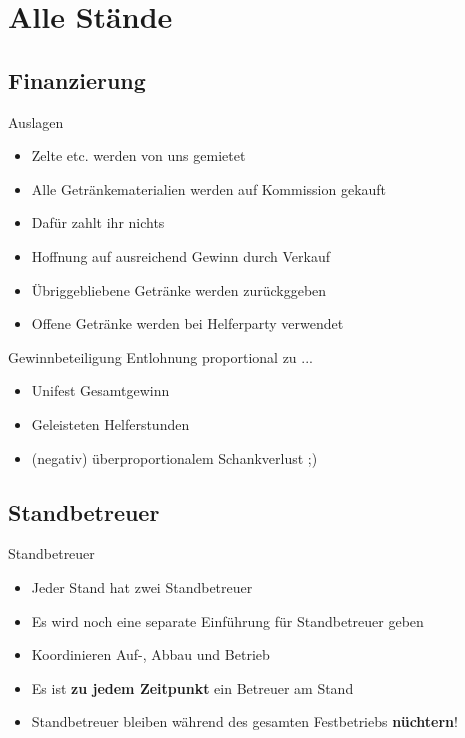 \section{Alle Stände}

\subsection{Finanzierung}

\begin{frame}[c]{Auslagen}
    \begin{itemize}[<+(1)->]
        \item Zelte etc. werden von uns gemietet
        \item Alle Getränkematerialien werden auf Kommission gekauft
        \item Dafür zahlt ihr nichts
        \item Hoffnung auf ausreichend Gewinn durch Verkauf
        \item Übriggebliebene Getränke werden zurückggeben
        \item Offene Getränke werden bei Helferparty verwendet
    \end{itemize}
\end{frame}

\begin{frame}[c]{Gewinnbeteiligung}
    Entlohnung proportional zu ...
    \begin{itemize}[<+(1)->]
        \item Unifest Gesamtgewinn
        \item Geleisteten Helferstunden
        \item (negativ) überproportionalem Schankverlust ;)
    \end{itemize}
\end{frame}


\subsection{Standbetreuer}

\begin{frame}[c]{Standbetreuer}
    \begin{itemize}[<+(1)->]
        \item Jeder Stand hat zwei Standbetreuer
        \item Es wird noch eine separate Einführung für Standbetreuer geben
        \item Koordinieren Auf-, Abbau und Betrieb
        \item Es ist \textbf{zu jedem Zeitpunkt} ein Betreuer am Stand
        \item Standbetreuer bleiben während des gesamten Festbetriebs \textbf{nüchtern}!
    \end{itemize}
\end{frame}



